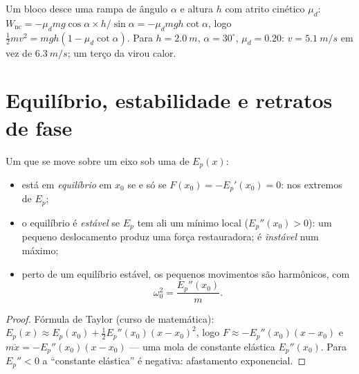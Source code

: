 \begin{example}\label{ex:b1:work-and-energy:friction}
Um bloco desce uma rampa de ângulo $\alpha$ e altura $h$ com
atrito cinético $\mu_d$: $W_{\text{nc}} = -\mu_dmg\cos\alpha \times
h/\sin\alpha = -\mu_dmgh\cot\alpha$, logo $\tfrac12 mv^2 = mgh(1 - \mu_d\cot\alpha)$.
Para $h = \qty{2.0}{m}$, $\alpha = 30^\circ$, $\mu_d = 0.20$: $v =
\qty{5.1}{m/s}$ em vez de $\qty{6.3}{m/s}$; um terço da  virou calor.
\end{example}

\section{Equilíbrio, estabilidade e retratos de fase}

\begin{proposition}\label{prop:b1:work-and-energy:stability}
Um  que se move sobre um eixo sob uma  de  $E_p(x)$:
\begin{itemize}
  \item está em \emph{equilíbrio} em $x_0$ se e só se $F(x_0) = -E_p'(x_0) = 0$:
        nos extremos de $E_p$;
  \item o equilíbrio é \emph{estável} se $E_p$ tem ali um mínimo local
        ($E_p''(x_0) > 0$): um pequeno deslocamento produz uma
        força restauradora; é \emph{instável} num máximo;
  \item perto de um equilíbrio estável, os pequenos movimentos são harmônicos, com
        \[
        \omega_0^2 = \frac{E_p''(x_0)}{m} .
        \]
\end{itemize}
\end{proposition}

\begin{proof}
Fórmula de Taylor (curso de matemática): $E_p(x) \approx E_p(x_0) +
\tfrac12 E_p''(x_0)(x - x_0)^2$, logo $F \approx -E_p''(x_0)(x - x_0)$ e
$m\ddot x = -E_p''(x_0)(x - x_0)$ --- uma mola de constante elástica $E_p''(x_0)$.
Para $E_p'' < 0$ a ``constante elástica'' é negativa: afastamento exponencial.
\end{proof}

